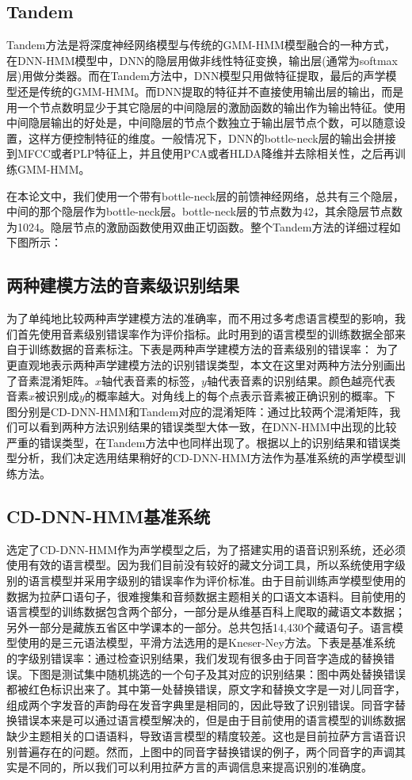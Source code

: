 \subsection{Tandem}
Tandem方法是将深度神经网络模型与传统的GMM-HMM模型融合的一种方式，在DNN-HMM模型中，DNN的隐层用做非线性特征变换，输出层(通常为softmax层)用做分类器。而在Tandem方法中，DNN模型只用做特征提取，最后的声学模型还是传统的GMM-HMM。而DNN提取的特征并不直接使用输出层的输出，而是用一个节点数明显少于其它隐层的中间隐层的激励函数的输出作为输出特征。使用中间隐层输出的好处是，中间隐层的节点个数独立于输出层节点个数，可以随意设置，这样方便控制特征的维度。一般情况下，DNN的bottle-neck层的输出会拼接到MFCC或者PLP特征上，并且使用PCA或者HLDA降维并去除相关性，之后再训练GMM-HMM。

在本论文中，我们使用一个带有bottle-neck层的前馈神经网络，总共有三个隐层，中间的那个隐层作为bottle-neck层。bottle-neck层的节点数为42，其余隐层节点数为1024。隐层节点的激励函数使用双曲正切函数。整个Tandem方法的详细过程如下图所示：{\color{red}{补充期刊论文图2}}
\subsection{两种建模方法的音素级识别结果}
为了单纯地比较两种声学建模方法的准确率，而不用过多考虑语言模型的影响，我们首先使用音素级别错误率作为评价指标。此时用到的语言模型的训练数据全部来自于训练数据的音素标注。下表是两种声学建模方法的音素级别的错误率：{\color{red}{补充期刊论文表2}}
为了更直观地表示两种声学建模方法的识别错误类型，本文在这里对两种方法分别画出了音素混淆矩阵。$x$轴代表音素的标签，$y$轴代表音素的识别结果。颜色越亮代表音素$x$被识别成$y$的概率越大。对角线上的每个点表示音素被正确识别的概率。下图分别是CD-DNN-HMM和Tandem对应的混淆矩阵：{\color{red}{补充期刊论文图3a,3b}}通过比较两个混淆矩阵，我们可以看到两种方法识别结果的错误类型大体一致，在DNN-HMM中出现的比较严重的错误类型，在Tandem方法中也同样出现了。根据以上的识别结果和错误类型分析，我们决定选用结果稍好的CD-DNN-HMM方法作为基准系统的声学模型训练方法。
\subsection{CD-DNN-HMM基准系统}
选定了CD-DNN-HMM作为声学模型之后，为了搭建实用的语音识别系统，还必须使用有效的语言模型。因为我们目前没有较好的藏文分词工具，所以系统使用字级别的语言模型并采用字级别的错误率作为评价标准。由于目前训练声学模型使用的数据为拉萨口语句子，很难搜集和音频数据主题相关的口语文本语料。目前使用的语言模型的训练数据包含两个部分，一部分是从维基百科上爬取的藏语文本数据；另外一部分是藏族五省区中学课本的一部分。总共包括14,430个藏语句子。语言模型使用的是三元语法模型，平滑方法选用的是Kneser-Ney方法。下表是基准系统的字级别错误率：{\color{red}{补充期刊论文表3}}通过检查识别结果，我们发现有很多由于同音字造成的替换错误。下图是测试集中随机挑选的一个句子及其对应的识别结果：{\color{red}{补充期刊论文图4}}图中两处替换错误都被红色标识出来了。其中第一处替换错误，原文字和替换文字是一对儿同音字，组成两个字发音的声韵母在发音字典里是相同的，因此导致了识别错误。同音字替换错误本来是可以通过语言模型解决的，但是由于目前使用的语言模型的训练数据缺少主题相关的口语语料，导致语言模型的精度较差。这也是目前拉萨方言语音识别普遍存在的问题。然而，上图中的同音字替换错误的例子，两个同音字的声调其实是不同的，所以我们可以利用拉萨方言的声调信息来提高识别的准确度。
